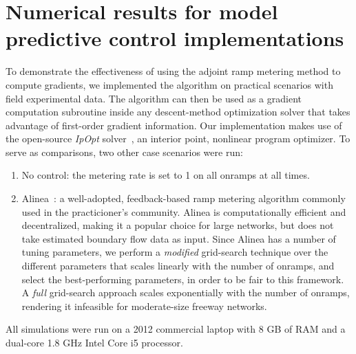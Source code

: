 \section{Numerical results for model predictive control implementations\label{sec:Numerical-results-for}}

To demonstrate the effectiveness of using the adjoint ramp metering
method to compute gradients, we implemented the algorithm on practical scenarios with field experimental data.
The algorithm can then be used as a gradient computation subroutine
inside any descent-method optimization solver that takes advantage
of first-order gradient information. Our implementation makes use
of the open-source \emph{IpOpt} solver~\cite{Andreas2005}, an interior point, nonlinear program optimizer. To serve
as comparisons, two other case scenarios were run:
\begin{enumerate}
	\item No control: the metering rate is set to 1 on all onramps at all times.
	\item Alinea~\cite{Papageorgiou1991}: a well-adopted, feedback-based ramp metering
	algorithm commonly used in the practicioner's community. Alinea is computationally efficient and decentralized,
	making it a popular choice for large networks, but does not take estimated
	boundary flow data as input. Since Alinea has a number of tuning parameters,
	we perform a \emph{modified} grid-search technique over the different
	parameters that scales linearly with the number of onramps, and select
	the best-performing parameters, in order to be fair to this framework. A \emph{full} grid-search approach
	scales exponentially with the number of onramps, rendering it infeasible
	for moderate-size freeway networks.
\end{enumerate}
All simulations were run on a 2012 commercial laptop with 8 GB of RAM and a dual-core 1.8 GHz Intel Core i5 processor.

